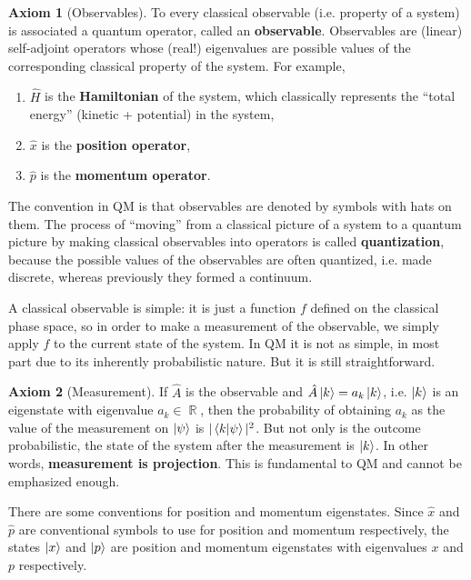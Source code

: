 \documentclass{report}
\theoremstyle{plain}
\theoremstyle{definition}
\newtheorem{axiom}{Axiom}
\theoremstyle{remark}
\DeclareMathOperator{\bR}{\mathbb{R}}
\begin{document}
\begin{axiom}[Observables]
  To every classical observable (i.e. property of a system) is
  associated a quantum operator, called an {\bf observable}.
  Observables are (linear) self-adjoint operators whose (real!)
  eigenvalues are possible values of the corresponding classical
  property of the system. For example,
  \begin{enumerate}
  \item $\hat{H}$ is the {\bf Hamiltonian} of the system, which
    classically represents the ``total energy'' (kinetic + potential)
    in the system,
  \item $\hat{x}$ is the {\bf position operator},
  \item $\hat{p}$ is the {\bf momentum operator}.
  \end{enumerate}
  The convention in QM is that observables are denoted by symbols with
  hats on them. The process of ``moving'' from a classical picture of
  a system to a quantum picture by making classical observables into
  operators is called {\bf quantization}, because the possible values
  of the observables are often quantized, i.e. made discrete, whereas
  previously they formed a continuum.
\end{axiom}

A classical observable is simple: it is just a function $f$ defined on
the classical phase space, so in order to make a measurement of the
observable, we simply apply $f$ to the current state of the system.
In QM it is not as simple, in most part due to its inherently
probabilistic nature. But it is still straightforward.

\begin{axiom}[Measurement]
  If $\hat{A}$ is the observable and $\hat{A}\ket{k} = a_k\ket{k}$,
  i.e. $\ket{k}$ is an eigenstate with eigenvalue $a_k \in \bR$, then
  the probability of obtaining $a_k$ as the value of the measurement
  on $\ket{\psi}$ is $|\braket{k|\psi}|^2$. But not only is the
  outcome probabilistic, the state of the system after the measurement
  is $\ket{k}$. In other words, {\bf measurement is projection}. This
  is fundamental to QM and cannot be emphasized enough.

  There are some conventions for position and momentum eigenstates.
  Since $\hat{x}$ and $\hat{p}$ are conventional symbols to use for
  position and momentum respectively, the states $\ket{x}$ and
  $\ket{p}$ are position and momentum eigenstates with eigenvalues $x$
  and $p$ respectively.
\end{axiom}
\end{document}
